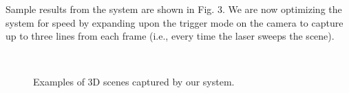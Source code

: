\documentclass{llncs}
\begin{document}
Sample results from the system are shown in Fig. 3.  We are now optimizing the system for speed by expanding upon the trigger mode on the camera to capture up to three lines from each frame (i.e., every time the laser sweeps the scene).

\begin{figure}[h]
\centering
{}\hfill%
\\
\caption{
Examples of 3D scenes captured by our system.
}
\end{figure}
\end{document}
